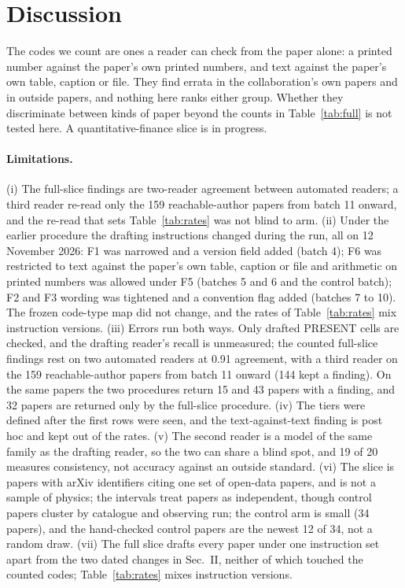 \documentclass[reprint,amsmath,amssymb,aps,superscriptaddress,nofootinbib]{revtex4-2}
\begin{document}
\section{Discussion}

The codes we count are ones a reader can check from the paper alone: a printed number against the paper's own printed numbers, and text against the paper's own table, caption or file. They find errata in the collaboration's own papers and in outside papers, and nothing here ranks either group. Whether they discriminate between kinds of paper beyond the counts in Table~\ref{tab:full} is not tested here. A quantitative-finance slice is in progress.

\paragraph*{Limitations.} (i) The full-slice findings are two-reader agreement between automated readers; a third reader re-read only the 159 reachable-author papers from batch 11 onward, and the re-read that sets Table~\ref{tab:rates} was not blind to arm. (ii) Under the earlier procedure the drafting instructions changed during the run, all on 12 November 2026: F1 was narrowed and a version field added (batch 4); F6 was restricted to text against the paper's own table, caption or file and arithmetic on printed numbers was allowed under F5 (batches 5 and 6 and the control batch); F2 and F3 wording was tightened and a convention flag added (batches 7 to 10). The frozen code-type map did not change, and the rates of Table~\ref{tab:rates} mix instruction versions. (iii) Errors run both ways. Only drafted PRESENT cells are checked, and the drafting reader's recall is unmeasured; the counted full-slice findings rest on two automated readers at 0.91 agreement, with a third reader on the 159 reachable-author papers from batch 11 onward (144 kept a finding). On the same papers the two procedures return 15 and 43 papers with a finding, and 32 papers are returned only by the full-slice procedure. (iv) The tiers were defined after the first rows were seen, and the text-against-text finding is post hoc and kept out of the rates. (v) The second reader is a model of the same family as the drafting reader, so the two can share a blind spot, and 19 of 20 measures consistency, not accuracy against an outside standard. (vi) The slice is papers with arXiv identifiers citing one set of open-data papers, and is not a sample of physics; the intervals treat papers as independent, though control papers cluster by catalogue and observing run; the control arm is small (34 papers), and the hand-checked control papers are the newest 12 of 34, not a random draw. (vii) The full slice drafts every paper under one instruction set apart from the two dated changes in Sec.~II, neither of which touched the counted codes; Table~\ref{tab:rates} mixes instruction versions.
\end{document}
